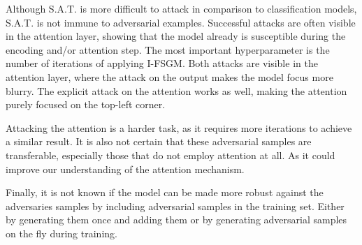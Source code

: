 Although S.A.T. is more difficult to attack in comparison to classification models, S.A.T. is not immune to adversarial examples. Successful attacks are often visible in the attention layer, showing that the model already is susceptible during the encoding and/or attention step. The most important hyperparameter is the number of iterations of applying I-FSGM.
Both attacks are visible in the attention layer, where the attack on the output makes the model focus more blurry. The explicit attack on the attention works as well, making the attention purely focused on the top-left corner.

Attacking the attention is a harder task, as it requires more iterations to achieve a similar result. It is also not certain that these adversarial samples are transferable, especially those that do not employ attention at all. As it could improve our understanding of the attention mechanism.

Finally, it is not known if the model can be made more robust against the adversaries samples by including adversarial samples in the training set. Either by generating them once and adding them or by generating adversarial samples on the fly during training.
